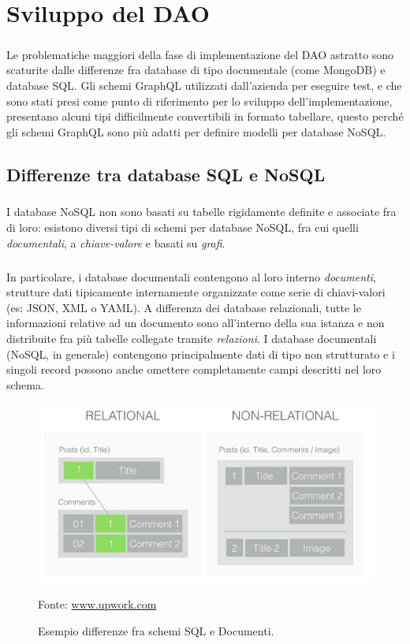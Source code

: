 \documentclass[a4paper, 12pt]{report}
\newcommand{\source}[1]{\caption*{Fonte: {#1}}}
\begin{document}
  \chapter{Sviluppo del DAO}
    \paragraph*{}
    Le problematiche maggiori della fase di implementazione del DAO astratto sono scaturite dalle differenze fra database di tipo documentale (come MongoDB) e database SQL.
    Gli schemi GraphQL utilizzati dall'azienda per eseguire test, e che sono stati presi come punto di riferimento per lo sviluppo dell'implementazione, presentano alcuni tipi difficilmente convertibili in formato tabellare, questo perché gli schemi GraphQL sono
    più adatti per definire modelli per database NoSQL.
    \section{Differenze tra database SQL e NoSQL}
    \paragraph*{}
      I database NoSQL non sono basati su tabelle rigidamente definite e associate fra di loro: esistono diversi tipi di schemi per database NoSQL, fra cui quelli \emph{documentali}, a \emph{chiave-valore} e basati su \emph{grafi}.
      \paragraph*{}
      In particolare, i database documentali contengono al loro interno \emph{documenti}, strutture dati tipicamente internamente organizzate come serie di chiavi-valori (es: JSON, XML o YAML).
      A differenza dei database relazionali, tutte le informazioni relative ad un documento sono all'interno della sua istanza e non distribuite fra più tabelle collegate tramite \emph{relazioni}.
      I database documentali (NoSQL, in generale) contengono principalmente dati di tipo non strutturato e i singoli record possono anche omettere completamente campi descritti nel loro schema.
      \begin{figure}[H]
        \includegraphics[width=\textwidth]{relational-documental.jpg}
        \caption{Esempio differenze fra schemi SQL e Documenti.}
        \source{\href{https://www.upwork.com/resources/sql-vs-nosql-databases-whats-the-difference/}{www.upwork.com}}
      \end{figure}
\end{document}
